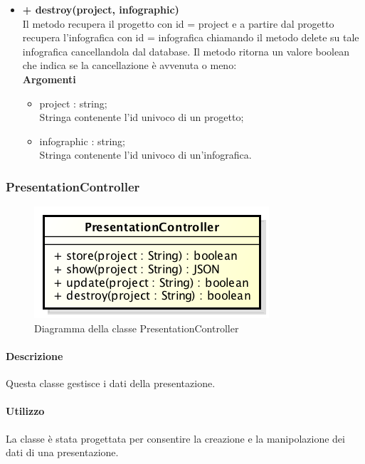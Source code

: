 \begin{itemize}
\begin{itemize}
			\end{itemize}
			\item \textbf{+ destroy(project, infographic)}\\
			Il metodo recupera il progetto con id = project e a partire dal progetto recupera l'infografica con id = infografica chiamando il metodo delete su tale infografica cancellandola dal database. Il metodo ritorna un valore boolean che indica se la cancellazione è avvenuta o meno:\\
			\textbf{Argomenti}
			\begin{itemize}
				\item project : string; \\
				Stringa contenente l'id univoco di un progetto;
				\item infographic : string; \\
				Stringa contenente l'id univoco di un'infografica.
			\end{itemize}
		\end{itemize}
		
\newpage
\subsubsection{PresentationController}
\begin{figure}[h]
\centering
\includegraphics[width=0.5\linewidth]{img/back_end_premi_http_controllers_presentationController}
\caption[Diagramma della classe PresentationController]{Diagramma della classe PresentationController}
\end{figure}


	\paragraph{Descrizione}
		Questa classe gestisce i dati della presentazione.
	\paragraph{Utilizzo}
		La classe è stata progettata per consentire la creazione e la manipolazione dei dati di una presentazione.
	
